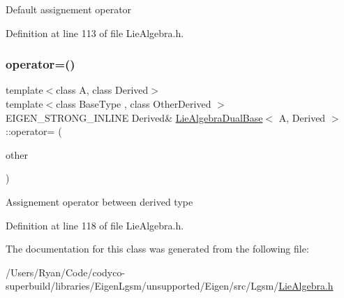 Default assignement operator 

Definition at line 113 of file Lie\+Algebra.\+h.

\hypertarget{class_lie_algebra_dual_base_afade5fdd0a47c9651ac3f5da3b957279}{}\label{class_lie_algebra_dual_base_afade5fdd0a47c9651ac3f5da3b957279} 
\subsubsection{\texorpdfstring{operator=()}{operator=()}\hspace{0.1cm}{\footnotesize\ttfamily [2/2]}}
{\footnotesize\ttfamily template$<$class A, class Derived$>$ \\
template$<$class Base\+Type , class Other\+Derived $>$ \\
E\+I\+G\+E\+N\+\_\+\+S\+T\+R\+O\+N\+G\+\_\+\+I\+N\+L\+I\+NE Derived\& \hyperlink{class_lie_algebra_dual_base}{Lie\+Algebra\+Dual\+Base}$<$ A, Derived $>$\+::operator= (\begin{DoxyParamCaption}\item[{const \hyperlink{class_lie_algebra_dual_base}{Lie\+Algebra\+Dual\+Base}$<$ \hyperlink{class_lie_algebra_dual_base_a1d0d10f7479bc0e235b13e29f1c012d2}{Base\+Type}, Other\+Derived $>$ \&}]{other }\end{DoxyParamCaption})\hspace{0.3cm}{\ttfamily [inline]}}

Assignement operator between derived type 

Definition at line 118 of file Lie\+Algebra.\+h.



The documentation for this class was generated from the following file\+:\begin{DoxyCompactItemize}
\item 
/\+Users/\+Ryan/\+Code/codyco-\/superbuild/libraries/\+Eigen\+Lgsm/unsupported/\+Eigen/src/\+Lgsm/\hyperlink{_lie_algebra_8h}{Lie\+Algebra.\+h}\end{DoxyCompactItemize}
